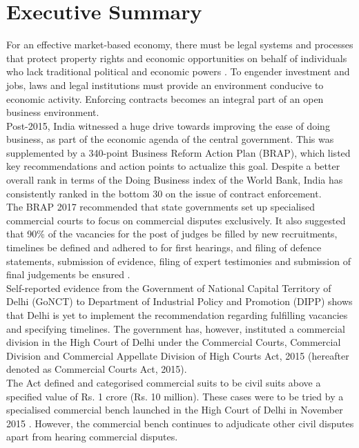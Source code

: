 \documentclass[a4paper, 12pt, twoside]{article}
\begin{document}
\newpage
\section*{Executive Summary}

For an effective market-based economy, there must be legal systems and processes that protect property rights and economic opportunities on behalf of individuals who lack traditional political and economic powers \parencite{WBreport}. To engender investment and jobs, laws and legal institutions must provide an environment conducive to economic activity. Enforcing contracts becomes an integral part of an open business environment. \\

Post-2015, India witnessed a huge drive towards improving the ease of doing business, as part of the economic agenda of the central government. This was supplemented by a 340-point Business Reform Action Plan (BRAP), which listed key recommendations and action points to actualize this goal. Despite a better overall rank in terms of the Doing Business index of the World Bank, India has consistently ranked in the bottom 30 on the issue of contract enforcement.\\

The BRAP 2017 recommended that state governments set up specialised commercial courts to focus on commercial disputes exclusively. It also suggested that 90\% of the vacancies for the post of judges be filled by new recruitments, timelines be defined and adhered to for first hearings, and filing of defence statements, submission of evidence, filing of expert testimonies and submission of final judgements be ensured \parencite{enfcontractreport}.\\

Self-reported evidence from the Government of National Capital Territory of Delhi (GoNCT) to Department of Industrial Policy and Promotion (DIPP) shows that Delhi is yet to implement the recommendation regarding fulfilling vacancies and specifying timelines. The government has, however, instituted a commercial division in the High Court of Delhi under the Commercial Courts, Commercial Division and Commercial Appellate Division of High Courts Act, 2015 (hereafter denoted as Commercial Courts Act, 2015).\\

The Act defined and categorised commercial suits to be civil suits above a specified value of Rs. 1 crore (Rs. 10 million). These cases were to be tried by a specialised commercial bench launched in the High Court of Delhi in November 2015 \parencite{circularnews}. 
However, the commercial bench continues to adjudicate other civil disputes apart from hearing commercial disputes.\\
\end{document}
